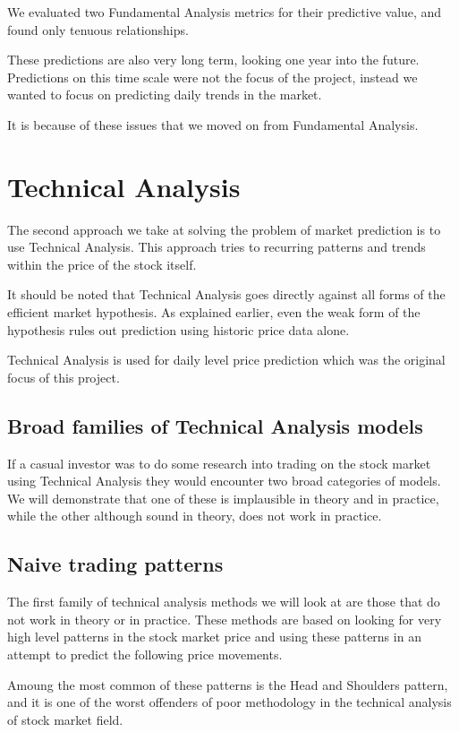 \documentclass{report}
\begin{document}
We evaluated two Fundamental Analysis metrics for their predictive value, and found only tenuous relationships.  

These predictions are also very long term, looking one year into the future. Predictions on this time scale were not the focus of the project, instead we wanted to focus on predicting daily trends in the market.

It is because of these issues that we moved on from Fundamental Analysis.

\chapter{Technical Analysis}


The second approach we take at solving the problem of market prediction is to use Technical Analysis. This approach tries to recurring patterns and trends within the price of the stock itself.

It should be noted that Technical Analysis goes directly against all forms of the efficient market hypothesis. As explained earlier, even the weak form of the hypothesis rules out prediction using historic price data alone.

Technical Analysis is used for daily level price prediction which was the original focus of this project. 

\section{Broad families of Technical Analysis models}

If a casual investor was to do some research into trading on the stock market using Technical Analysis they would encounter two broad categories of models. We will demonstrate that one of these is implausible in theory and in practice, while the other although sound in theory, does not work in practice.

\section{Naive trading patterns}

The first family of technical analysis methods we will look at are those that do not work in theory or in practice. These methods are based on looking for very high level patterns in the stock market price and using these patterns in an attempt to predict the following price movements.

Amoung the most common of these patterns is the Head and Shoulders pattern, and it is one of the worst offenders of poor methodology in the technical analysis of stock market field.
\end{document}
